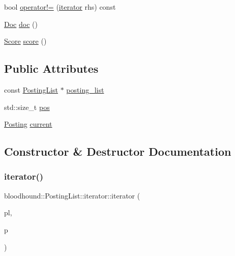 \begin{DoxyCompactItemize}
\item 
bool \mbox{\hyperlink{structbloodhound_1_1PostingList_1_1iterator_aa293b4e0607edaca2fde163c8ee0f00e}{operator!=}} (\mbox{\hyperlink{structbloodhound_1_1PostingList_1_1iterator}{iterator}} rhs) const
\item 
\mbox{\hyperlink{structbloodhound_1_1Doc}{Doc}} \mbox{\hyperlink{structbloodhound_1_1PostingList_1_1iterator_a995d206215c6a01d7a183666502e2628}{doc}} ()
\item 
\mbox{\hyperlink{structbloodhound_1_1Score}{Score}} \mbox{\hyperlink{structbloodhound_1_1PostingList_1_1iterator_a5c94dca7f430ac78f0db3f0fe2c01c75}{score}} ()
\end{DoxyCompactItemize}
\subsection*{Public Attributes}
\begin{DoxyCompactItemize}
\item 
const \mbox{\hyperlink{classbloodhound_1_1PostingList}{Posting\+List}} $\ast$ \mbox{\hyperlink{structbloodhound_1_1PostingList_1_1iterator_a3a9afedb85f883831ee68fee0611ca92}{posting\+\_\+list}}
\item 
std\+::size\+\_\+t \mbox{\hyperlink{structbloodhound_1_1PostingList_1_1iterator_a544fdd6020d2ec35d883250dd79115e8}{pos}}
\item 
\mbox{\hyperlink{structbloodhound_1_1Posting}{Posting}} \mbox{\hyperlink{structbloodhound_1_1PostingList_1_1iterator_ae4e6a0f32f80ac9f64558843a0a0cf0e}{current}}
\end{DoxyCompactItemize}


\subsection{Constructor \& Destructor Documentation}
\mbox{\label{structbloodhound_1_1PostingList_1_1iterator_af815248890d1f92dbd2cc3fa5813875a}} 
\subsubsection{\texorpdfstring{iterator()}{iterator()}}
{\footnotesize\ttfamily bloodhound\+::\+Posting\+List\+::iterator\+::iterator (\begin{DoxyParamCaption}\item[{const \mbox{\hyperlink{classbloodhound_1_1PostingList}{Posting\+List}} $\ast$}]{pl,  }\item[{std\+::size\+\_\+t}]{p }\end{DoxyParamCaption})\hspace{0.3cm}{\ttfamily [inline]}}



